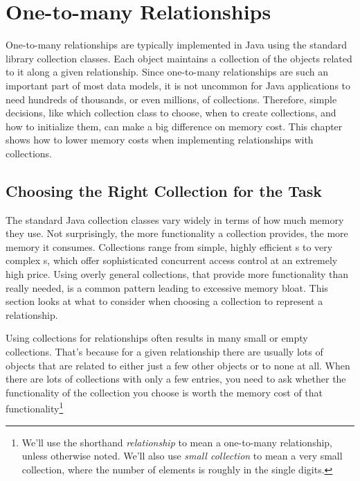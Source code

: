 \chapter{One-to-many Relationships}
\label{chapter:representing-relationships}

One-to-many relationships
are typically implemented in Java using the standard library collection classes.
Each object maintains a collection of the objects related to
it along a given relationship. Since one-to-many relationships are such an
important part of most data models, it is not uncommon for Java applications to
need hundreds of thousands, or even millions, of collections.
Therefore, simple decisions, like which collection class to choose,
when to create collections, and how to initialize them,
can make a big difference on memory cost.
This chapter shows how to lower memory costs when implementing
relationships with collections.
 
 \section{Choosing the Right Collection for the Task}
 \label{section:choosing-collection}

The standard Java collection classes vary widely in terms of how much memory they use.
Not surprisingly, the more functionality a collection provides, the more
memory it consumes. Collections range from simple, highly efficient
s to very complex
s, which offer sophisticated concurrent access
control at an extremely high price. 
Using overly general collections, that provide more functionality than
really needed, is a common pattern leading to excessive memory bloat.
This section looks at what to consider when choosing a collection to
represent a relationship. 

Using collections for relationships often results in many small or
empty collections.  That's because for a given relationship there are
usually lots of objects that are related to either just a few other
objects or to none at all.
When there are lots of collections with only a few entries, you need to ask  whether
the functionality of the collection you choose is worth the memory cost of that
functionality\footnote{We'll use the shorthand
\emph{relationship} to mean a one-to-many relationship, unless otherwise noted. 
We'll also use \emph{small collection} to mean a very small collection, where
the number of elements is roughly in the single digits.}

